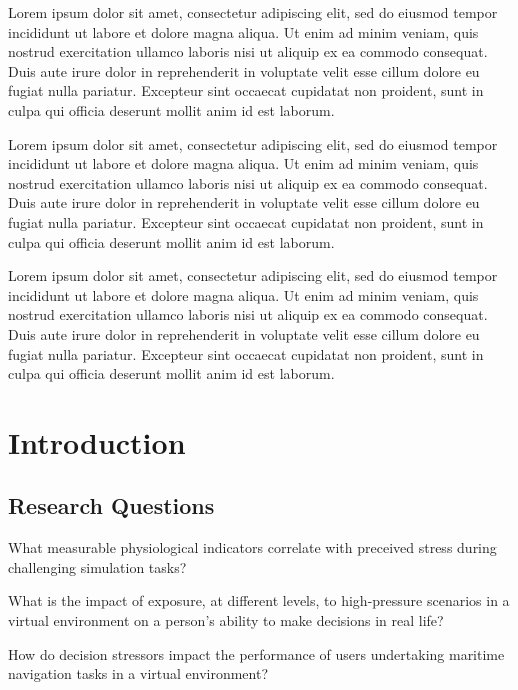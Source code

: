 \documentclass[12pt]{article}
\begin{document}
Lorem ipsum dolor sit amet, consectetur adipiscing elit, sed do eiusmod tempor incididunt ut labore et dolore magna aliqua. Ut enim ad minim veniam, quis nostrud exercitation ullamco laboris nisi ut aliquip ex ea commodo consequat. Duis aute irure dolor in reprehenderit in voluptate velit esse cillum dolore eu fugiat nulla pariatur. Excepteur sint occaecat cupidatat non proident, sunt in culpa qui officia deserunt mollit anim id est laborum.

Lorem ipsum dolor sit amet, consectetur adipiscing elit, sed do eiusmod tempor incididunt ut labore et dolore magna aliqua. Ut enim ad minim veniam, quis nostrud exercitation ullamco laboris nisi ut aliquip ex ea commodo consequat. Duis aute irure dolor in reprehenderit in voluptate velit esse cillum dolore eu fugiat nulla pariatur. Excepteur sint occaecat cupidatat non proident, sunt in culpa qui officia deserunt mollit anim id est laborum.

Lorem ipsum dolor sit amet, consectetur adipiscing elit, sed do eiusmod tempor incididunt ut labore et dolore magna aliqua. Ut enim ad minim veniam, quis nostrud exercitation ullamco laboris nisi ut aliquip ex ea commodo consequat. Duis aute irure dolor in reprehenderit in voluptate velit esse cillum dolore eu fugiat nulla pariatur. Excepteur sint occaecat cupidatat non proident, sunt in culpa qui officia deserunt mollit anim id est laborum.

\newpage

\tableofcontents

\newpage

\listoftables

\newpage

\listoffigures

\section{Introduction}

\subsection{Research Questions}

What measurable physiological indicators correlate with preceived stress during challenging simulation tasks?

What is the impact of exposure, at different levels, to high-pressure scenarios in a virtual environment on a person's ability to make decisions in real life?

How do decision stressors impact the performance of users undertaking maritime navigation tasks in a virtual environment?
\end{document}
